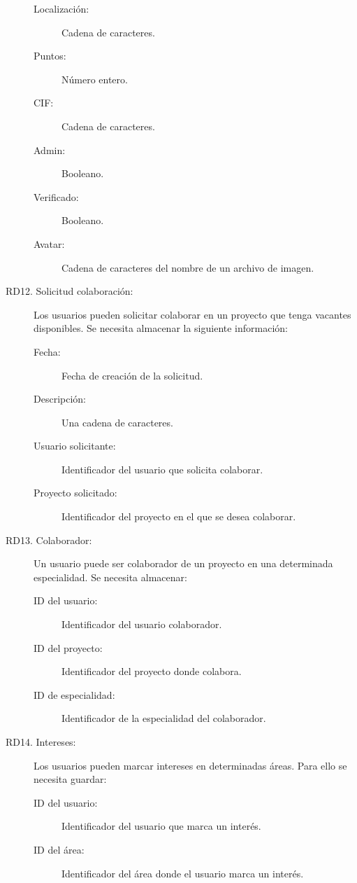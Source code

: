 \begin{description}
\begin{description}
            \item[Localización:] Cadena de caracteres.
            \item[Puntos:] Número entero.
            \item[CIF:] Cadena de caracteres.
            \item[Admin:] Booleano.
            \item[Verificado:] Booleano.
            \item[Avatar:] Cadena de caracteres del nombre de un archivo de imagen.
        \end{description}
    \item[RD12. Solicitud colaboración:] Los usuarios pueden solicitar colaborar en un proyecto que tenga vacantes disponibles. Se necesita almacenar la siguiente información:
        \begin{description}
            \item[Fecha:] Fecha de creación de la solicitud.
            \item[Descripción:] Una cadena de caracteres.
            \item[Usuario solicitante:] Identificador del usuario que solicita colaborar.
            \item[Proyecto solicitado:] Identificador del proyecto en el que se desea colaborar.
        \end{description}
    \item[RD13. Colaborador:] Un usuario puede ser colaborador de un proyecto en una determinada especialidad. Se necesita almacenar:
        \begin{description}
            \item[ID del usuario:] Identificador del usuario colaborador.
            \item[ID del proyecto:] Identificador del proyecto donde colabora.
            \item[ID de especialidad:] Identificador de la especialidad del colaborador.
        \end{description}
    \item[RD14. Intereses:] Los usuarios pueden marcar intereses en determinadas áreas. Para ello se necesita guardar:
        \begin{description}
            \item[ID del usuario:] Identificador del usuario que marca un interés.
            \item[ID del área:] Identificador del área donde el usuario marca un interés.
        \end{description}

\end{description}

